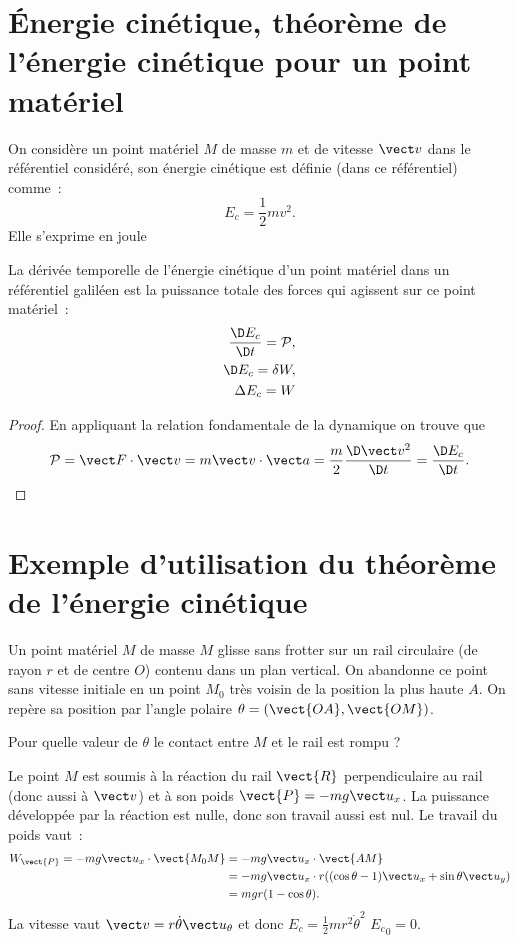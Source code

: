 \section{Énergie cinétique, théorème de l'énergie cinétique pour un point matériel}
\label{chap4-sec:ernergiecinetique}

\begin{defdef}
  On considère un point matériel $M$ de masse $m$ et de vitesse $\vv$ dans le référentiel considéré, son énergie cinétique est définie (dans ce référentiel) comme~:
  \begin{equation}
    E_c = \frac{1}{2} m v^2.
  \end{equation}
  Elle s'exprime en joule
\end{defdef}
\begin{theo}
  La dérivée temporelle de l'énergie cinétique d'un point matériel dans un référentiel galiléen est la puissance totale des forces qui agissent sur ce point matériel~:
  \begin{align}
    \derived{E_c}{t} = \P, \\
    \diff E_c = \delta W, \\
    \Delta E_c = W
  \end{align}
\end{theo}
\begin{proof}
  En appliquant la relation fondamentale de la dynamique on trouve que
  \begin{equation}
    \P = \vF \cdot \vv = m \vv \cdot \va = \frac{m}{2} \derived{\vv^2}{t} = \derived{E_c}{t}.
  \end{equation}
\end{proof}

\section{Exemple d'utilisation du théorème de l'énergie cinétique}
\label{chap4-sec:exempletheoremeenergiecinetique}

Un point matériel $M$ de masse $M$ glisse sans frotter sur un rail circulaire (de rayon $r$ et de centre $O$) contenu dans un plan vertical. On abandonne ce point sans vitesse initiale en un point $M_0$ très voisin de la position la plus haute $A$. On repère sa position par l'angle polaire $\theta = (\vect{OA}, \vect{OM})$. 

Pour quelle valeur de $\theta$ le contact entre $M$ et le rail est rompu ?

Le point $M$ est soumis à la réaction du rail $\vect{R}$ perpendiculaire au rail (donc aussi à $\vv$) et à son poids $\vect{P} = -mg\ux$.  La puissance développée par la réaction est nulle, donc son travail aussi est nul. Le travail du poids vaut~:
\begin{align}
  W_{\vect{P}} = -mg\ux \cdot \vect{M_0M} &= -mg\ux \cdot \vect{AM} \\
  &= -mg\ux \cdot r((\cos\theta -1)\ux + \sin\theta \uy) \\
  &=mgr(1-\cos\theta).
\end{align}
La vitesse vaut $\vv = r\dot{\theta} \utheta$ et donc $E_c = \frac{1}{2}mr^2\dot{\theta}^2$ ${E_c}_{0}=0$. 

